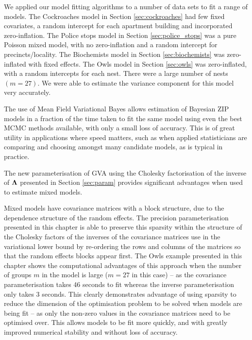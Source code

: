 We applied our model fitting algorithms to a number of data sets to fit a range
of models. The Cockroaches model in Section \ref{sec:cockroaches} had few fixed
covariates, a random intercept for each apartment building and incorporated
zero-inflation. The Police stops model in Section \ref{sec:police_stops} was a
pure Poisson mixed model, with no zero-inflation and a random intercept for
precincts/locality. The Biochemists model in Section \ref{sec:biochemists} was
zero-inflated with fixed effects. The Owls model in Section \ref{sec:owls} was
zero-inflated,  with a random intercepts for each nest. There were a large
number of nests $(m=27)$. We were able to estimate the variance component for
this model very accurately.

The use of Mean Field Variational Bayes allows estimation of Bayesian ZIP
models in a fraction of the time taken to fit the same model using even the
best MCMC methods available, with only a small loss of accuracy. This is of
great utility in applications where speed matters, such as when applied
statisticians are comparing and choosing amongst many candidate models, as is
typical in practice.

The new parameterisation of GVA using the
Cholesky factorisation of the inverse of ${\boldsymbol \Lambda}$ presented in Section
\ref{sec:param} provides significant advantages when used to estimate mixed
models.

Mixed models have covariance matrices with a block structure, due to the
dependence structure of the random effects. The precision parameterisation
presented in this chapter is able to preserve this sparsity within the
structure of the Cholesky factors of the inverses of the covariance matrices
use in the variational lower bound by re-ordering the rows and columns of the
matrices so that the random effects blocks appear first. The Owls example
presented in this chapter shows the computational advantages of this approach
when the number of groups $m$ in the model is large ($m=27$ in this case) -- as
the covariance parameterisation takes 46 seconds to fit whereas the inverse
parameterisation only takes 3 seconds. This clearly demonstrates advantage of
using sparsity to reduce the dimension of the optimisation problem to be solved
when models are being fit -- as only the non-zero values in the covariance
matrices need to be optimised over. This allows models to be fit more quickly,
and with greatly improved numerical stability and without loss of accuracy.

